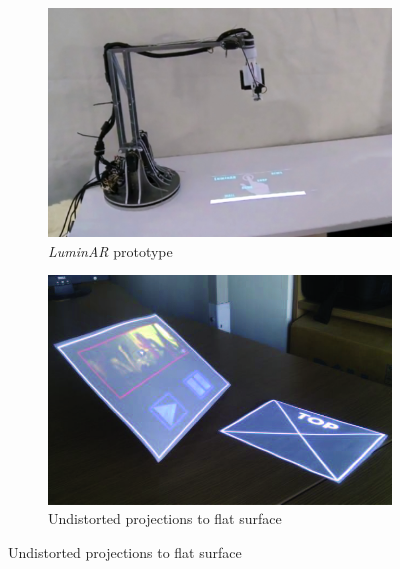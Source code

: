 \begin{figure}
        \centering
        \begin{subfigure}[b]{0.3\textwidth}
                \includegraphics[width=\textwidth]{images/relatedwork/luminar.jpg}
                \caption{\textit{LuminAR} prototype\newline}
                \label{img:luminar}
        \end{subfigure}
        \quad%
        \begin{subfigure}[b]{0.3\textwidth}
                \includegraphics[width=\textwidth]{images/relatedwork/hardy.jpg}
                \caption{Undistorted projections to flat surface}
                \label{img:hardy}
        \end{subfigure}

\end{figure}
